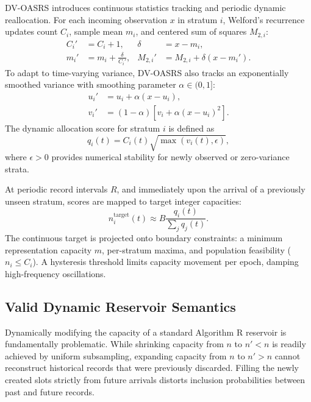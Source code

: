 \documentclass[conference]{IEEEtran}
\begin{document}
DV-OASRS introduces continuous statistics tracking and periodic dynamic reallocation. For each incoming observation $x$ in stratum $i$, Welford's recurrence updates count $C_i$, sample mean $m_i$, and centered sum of squares $M_{2,i}$:
\begin{align}
 C_i'&=C_i+1, & \delta&=x-m_i,\\
 m_i'&=m_i+\frac{\delta}{C_i'}, &
 M_{2,i}'&=M_{2,i}+\delta(x-m_i').
\end{align}
To adapt to time-varying variance, DV-OASRS also tracks an exponentially smoothed variance with smoothing parameter $\alpha\in(0,1]$:
\begin{align}
 u_i' &=u_i+\alpha(x-u_i),\\
 v_i' &=(1-\alpha)\left[v_i+\alpha(x-u_i)^2\right].
\end{align}
The dynamic allocation score for stratum $i$ is defined as
\begin{equation}
 q_i(t)=C_i(t)\sqrt{\max(v_i(t),\epsilon)},
 \label{eq:dynamic-score}
\end{equation}
where $\epsilon>0$ provides numerical stability for newly observed or zero-variance strata.

At periodic record intervals $R$, and immediately upon the arrival of a previously unseen stratum, scores are mapped to target integer capacities:
\begin{equation}
 n_i^{\mathrm{target}}(t)\approx B\frac{q_i(t)}{\sum_jq_j(t)}.
\end{equation}
The continuous target is projected onto boundary constraints: a minimum representation capacity $m$, per-stratum maxima, and population feasibility ($n_i \le C_i$). A hysteresis threshold limits capacity movement per epoch, damping high-frequency oscillations.

\subsection{Valid Dynamic Reservoir Semantics}

Dynamically modifying the capacity of a standard Algorithm R reservoir is fundamentally problematic. While shrinking capacity from $n$ to $n'<n$ is readily achieved by uniform subsampling, expanding capacity from $n$ to $n'>n$ cannot reconstruct historical records that were previously discarded. Filling the newly created slots strictly from future arrivals distorts inclusion probabilities between past and future records.
\end{document}
